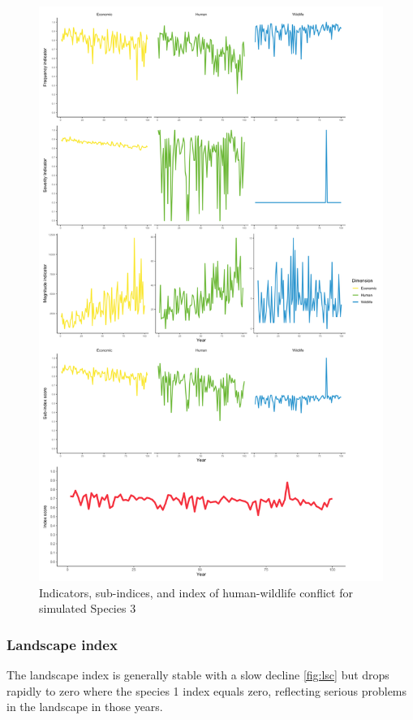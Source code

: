 \documentclass[fleqn,10pt]{olplainarticle}
\begin{document}
\begin{figure}
    \centering
    \includegraphics[width = 1\textwidth]{sp3_all.png}
    \caption{Indicators, sub-indices, and index of human-wildlife conflict for simulated Species 3}
    \label{fig:sp3}
\end{figure}

\subsubsection*{Landscape index}
The landscape index is generally stable with a slow decline \ref{fig:lsc} but drops rapidly to zero where the species 1 index equals zero, reflecting serious problems in the landscape in those years.
\end{document}
